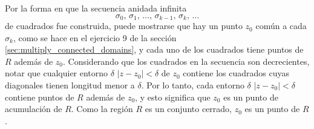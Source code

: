 \documentclass[a4paper]{report}
\begin{document}
Por la forma en que la secuencia anidada infinita 
\begin{equation}\label{eq:cauchy_goursat_lemma_sequence}
 \sigma_0,\,\sigma_1,\,\dots,\,\sigma_{k-1},\,\sigma_k,\,\dots
\end{equation}
de cuadrados fue construida, puede mostrarse que hay un punto \(z_0\) común a cada \(\sigma_k\), como se hace en el ejercicio 9 de la sección \ref{sec:multiply_connected_domains}, y cada uno de los cuadrados tiene puntos de \(R\) además de \(z_0\). Considerando que los cuadrados en la secuencia son decrecientes, notar que cualquier entorno \(\delta\) \(|z-z_0|<\delta\) de \(z_0\) contiene los cuadrados cuyas diagonales tienen longitud menor a \(\delta\). Por lo tanto, cada entorno \(\delta\) \(|z-z_0|<\delta\) contiene puntos de \(R\) además de \(z_0\), y esto significa que \(z_0\) es un punto de acumulación de \(R\). Como la región \(R\) es un conjunto cerrado, \(z_0\) es un punto de \(R\).
\end{document}
